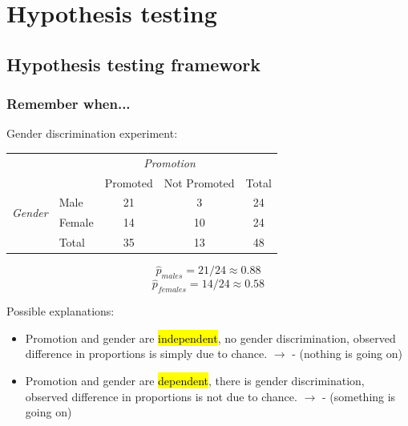 
\section{Hypothesis testing}


\subsection{Hypothesis testing framework}


\begin{frame}
\frametitle{Remember when...}

Gender discrimination experiment:

{\small
\begin{tabular}{ll  cc c} 
  		&				& \multicolumn{2}{c}{\textit{Promotion}} \\
\cline{3-4}
							&			& Promoted	& Not Promoted 	& Total	\\
\cline{2-5}
\multirow{2}{*}{\textit{Gender	}}	&Male 		& 21	 	& 3		& 24 	\\
							&Female		& 14	 	& 10 	 	& 24 \\
\cline{2-5}
							&Total		& 35		& 13		& 48 \\
\end{tabular}
}

\pause

\[ \hat{p}_{males} = 21 / 24 \approx 0.88 \]
\[ \hat{p}_{females} = 14 / 24 \approx 0.58 \]

\pause

Possible explanations:
\begin{itemize}
\item Promotion and gender are \hl{independent}, no gender discrimination, observed difference in proportions is simply due to chance. $\rightarrow$  - {\small (nothing is going on)}
\item Promotion and gender are \hl{dependent}, there is gender discrimination, observed difference in proportions is not due to chance. $\rightarrow$  - {\small (something is going on)}

\end{itemize}

\end{frame}


